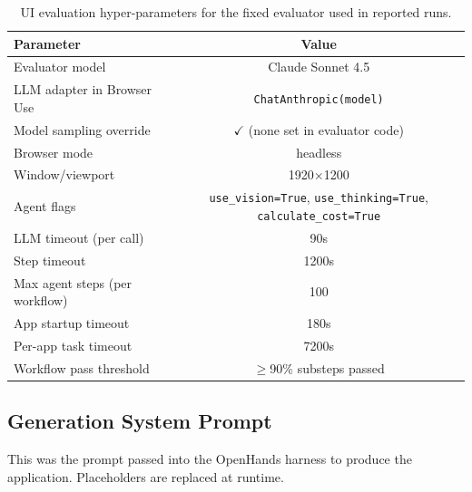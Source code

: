 \begin{table}[!h]
\caption{UI evaluation hyper-parameters for the fixed evaluator used in reported runs.}
\label{tab:ui_eval_hparams_sonnet45}
\small
\begin{tabular}{@{}p{6.0cm} c c c c c@{}}
\toprule
\textbf{Parameter} & \multicolumn{5}{c}{\textbf{Value}} \\
\midrule
Evaluator model & \multicolumn{5}{c}{Claude Sonnet 4.5} \\
LLM adapter in Browser Use & \multicolumn{5}{c}{\texttt{ChatAnthropic(model)}} \\
Model sampling override & \multicolumn{5}{c}{$\checkmark$ (none set in evaluator code)} \\
Browser mode & \multicolumn{5}{c}{headless} \\
Window/viewport & \multicolumn{5}{c}{1920$\times$1200} \\
Agent flags & \multicolumn{5}{c}{\texttt{use\_vision=True}, \texttt{use\_thinking=True}, \texttt{calculate\_cost=True}} \\
LLM timeout (per call) & \multicolumn{5}{c}{90s} \\
Step timeout & \multicolumn{5}{c}{1200s} \\
Max agent steps (per workflow) & \multicolumn{5}{c}{100} \\
App startup timeout & \multicolumn{5}{c}{180s} \\
Per-app task timeout & \multicolumn{5}{c}{7200s} \\
Workflow pass threshold & \multicolumn{5}{c}{$\geq$90\% substeps passed} \\
\bottomrule
\end{tabular}
\end{table}

\clearpage
\subsection{Generation System Prompt}
\label{sec:generation-prompt}
This was the prompt passed into the OpenHands harness to produce the application. Placeholders are replaced at runtime.


